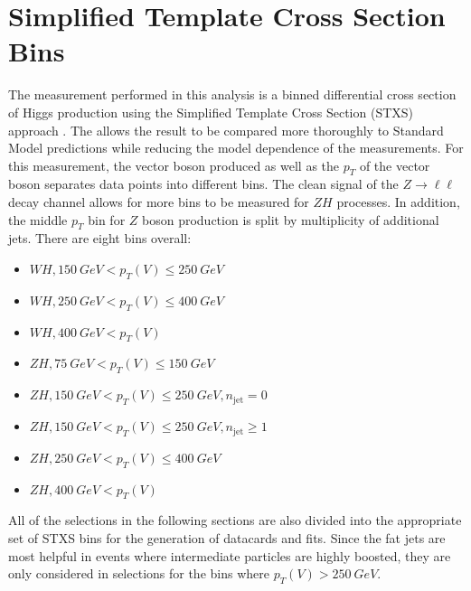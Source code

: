 
\section{Simplified Template Cross Section Bins}

The measurement performed in this analysis is a binned differential
cross section of Higgs production
using the Simplified Template Cross Section (STXS) approach \cite{Kato:2687920}.
The allows the result to be compared more thoroughly to Standard Model predictions
while reducing the model dependence of the measurements.
For this measurement, the vector boson produced as well as the $p_T$ of the vector boson
separates data points into different bins.
The clean signal of the $Z\rightarrow\ell\ell$ decay channel allows for more
bins to be measured for $ZH$ processes.
In addition, the middle $p_T$ bin for $Z$ boson production is split by multiplicity
of additional jets.
There are eight bins overall:
\begin{itemize}
\item $WH, \SI{150}{GeV} < p_T(V) \le \SI{250}{GeV}$
\item $WH, \SI{250}{GeV} < p_T(V) \le \SI{400}{GeV}$
\item $WH, \SI{400}{GeV} < p_T(V)$
\item $ZH, \SI{75}{GeV} < p_T(V) \le \SI{150}{GeV}$
\item $ZH, \SI{150}{GeV} < p_T(V) \le \SI{250}{GeV}, n_\mathrm{jet} = 0$
\item $ZH, \SI{150}{GeV} < p_T(V) \le \SI{250}{GeV}, n_\mathrm{jet} \ge 1$
\item $ZH, \SI{250}{GeV} < p_T(V) \le \SI{400}{GeV}$
\item $ZH, \SI{400}{GeV} < p_T(V)$
\end{itemize}
All of the selections in the following sections are also divided into the appropriate
set of STXS bins for the generation of datacards and fits.
Since the fat jets are most helpful in events where
intermediate particles are highly boosted,
they are only considered in selections for the bins where $p_T(V) > \SI{250}{GeV}$.

